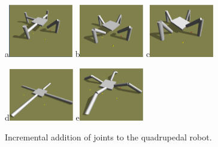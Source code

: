 \documentclass[12pt]{article}
\begin{document}
\begin{figure}[!t]
\centerline{
a\includegraphics[width=0.25\textwidth]{Fig1a.eps}
b\includegraphics[width=0.25\textwidth]{Fig1b.eps}
c\includegraphics[width=0.25\textwidth]{Fig1c.eps}}
\centerline{
d\includegraphics[width=0.25\textwidth]{Fig1d.eps}
e\includegraphics[width=0.25\textwidth]{Fig1e.eps}}
\caption{Incremental addition of joints to the quadrupedal robot.}
\label{Fig1}
\end{figure}
\end{document}
